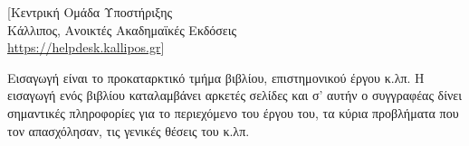 [Κεντρική Ομάδα Υποστήριξης\\ Κάλλιπος, Ανοικτές Ακαδημαϊκές Εκδόσεις\\ \url{https://helpdesk.kallipos.gr}]  



Εισαγωγή είναι το προκαταρκτικό τμήμα βιβλίου, επιστημονικού έργου κ.λπ. 
Η εισαγωγή ενός βιβλίου καταλαμβάνει αρκετές σελίδες και σ’ αυτήν ο συγγραφέας δίνει σημαντικές πληροφορίες για το περιεχόμενο του έργου του, τα κύρια προβλήματα που τον απασχόλησαν, τις γενικές θέσεις του κ.λπ. 
